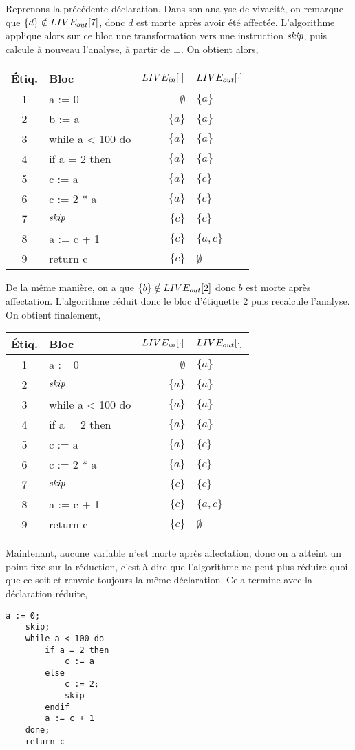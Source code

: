 \documentclass[a4paper, 10pt]{article}
\begin{document}
\begin{example}
Reprenons la précédente déclaration. Dans son analyse de vivacité, on remarque que
$\{d\} \notin LIVE_{out}[7]$, donc $d$ est morte après avoir été affectée. L'algorithme
applique alors sur ce bloc une transformation vers une instruction $\textit{skip}$, puis calcule
à nouveau l'analyse, à partir de $\bot$. On obtient alors,
\\
\begin{center}
	\begin{tabular}{||c|l|r|l||}
	\hline
	Étiq. & Bloc & $LIVE_{in}[\cdot]$ & $LIVE_{out}[\cdot]$ \\
	\hline
	1 & a := 0 & $\emptyset$ & $\{a\}$\\
	2 & b := a & $\{a\}$ & $\{a\}$\\
	3 & while a < 100 do & $\{a\}$ & $\{a\}$\\
	4 & if a = 2 then & $\{a\}$ & $\{a\}$\\
	5 & c := a & $\{a\}$ & $\{c\}$\\
	6 & c := 2 * a & $\{a\}$ & $\{c\}$\\
	7 & $\textit{skip}$ & $\{c\}$ & $\{c\}$\\
	8 & a := c + 1 & $\{c\}$ & $\{a, c\}$\\
	9 & return c & $\{c\}$ & $\emptyset$\\
	\hline
	\end{tabular}
\end{center}
De la même manière, on a que $\{b\} \notin LIVE_{out}[2]$ donc $b$ est morte après
affectation. L'algorithme réduit donc le bloc d'étiquette 2 puis recalcule l'analyse.
On obtient finalement,
\\
\begin{center}
	\begin{tabular}{||c|l|r|l||}
	\hline
	Étiq. & Bloc & $LIVE_{in}[\cdot]$ & $LIVE_{out}[\cdot]$ \\
	\hline
	1 & a := 0 & $\emptyset$ & $\{a\}$\\
	2 & $\textit{skip}$ & $\{a\}$ & $\{a\}$\\
	3 & while a < 100 do & $\{a\}$ & $\{a\}$\\
	4 & if a = 2 then & $\{a\}$ & $\{a\}$\\
	5 & c := a & $\{a\}$ & $\{c\}$\\
	6 & c := 2 * a & $\{a\}$ & $\{c\}$\\
	7 & $\textit{skip}$ & $\{c\}$ & $\{c\}$\\
	8 & a := c + 1 & $\{c\}$ & $\{a, c\}$\\
	9 & return c & $\{c\}$ & $\emptyset$\\
	\hline
	\end{tabular}
\end{center}
Maintenant, aucune variable n'est morte après affectation, donc on a atteint un point fixe
sur la réduction, c'est-à-dire que l'algorithme ne peut plus réduire quoi que ce soit et renvoie
toujours la même déclaration. Cela termine avec la déclaration réduite,
\begin{lstlisting}[tabsize=2]
	a := 0;
	skip;
	while a < 100 do
		if a = 2 then
			c := a
		else
			c := 2;
			skip
		endif
		a := c + 1
	done;
	return c
\end{lstlisting}
\end{example}
\end{document}
